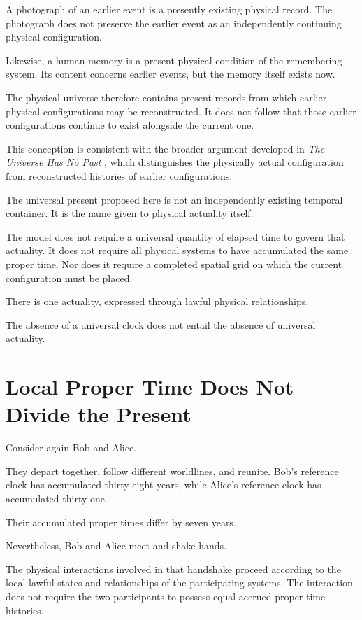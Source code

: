 \documentclass[12pt,onecolumn]{article}
\begin{document}
A photograph of an earlier event is a presently existing physical record. The photograph does not preserve the earlier event as an independently continuing physical configuration.

Likewise, a human memory is a present physical condition of the remembering system. Its content concerns earlier events, but the memory itself exists now.

The physical universe therefore contains present records from which earlier physical configurations may be reconstructed. It does not follow that those earlier configurations continue to exist alongside the current one.

This conception is consistent with the broader argument developed in \emph{The Universe Has No Past} \cite{NoPast}, which distinguishes the physically actual configuration from reconstructed histories of earlier configurations.

The universal present proposed here is not an independently existing temporal container. It is the name given to physical actuality itself.

The model does not require a universal quantity of elapsed time to govern that actuality. It does not require all physical systems to have accumulated the same proper time. Nor does it require a completed spatial grid on which the current configuration must be placed.

There is one actuality, expressed through lawful physical relationships.

The absence of a universal clock does not entail the absence of universal actuality.

\section{Local Proper Time Does Not Divide the Present}

Consider again Bob and Alice.

They depart together, follow different worldlines, and reunite. Bob's reference clock has accumulated thirty-eight years, while Alice's reference clock has accumulated thirty-one.

Their accumulated proper times differ by seven years.

Nevertheless, Bob and Alice meet and shake hands.

The physical interactions involved in that handshake proceed according to the local lawful states and relationships of the participating systems. The interaction does not require the two participants to possess equal accrued proper-time histories.
\end{document}
